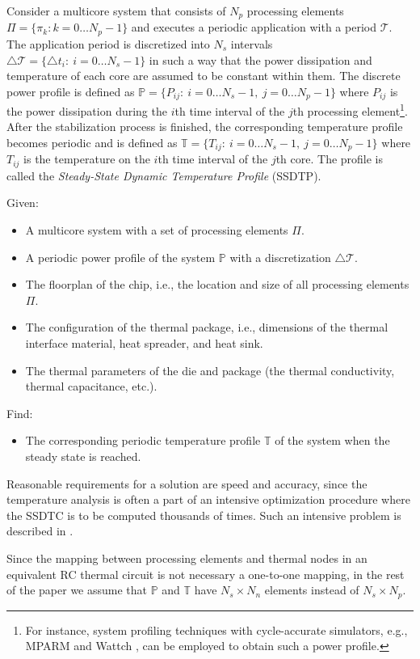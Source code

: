 Consider a multicore system that consists of $N_p$ processing elements $\Pi = \{ \pi_k: k = 0 \dots N_p - 1 \}$ and executes a periodic application with a period $\mathcal{T}$. The application period is discretized into $N_s$ intervals $\triangle \mathcal{T} = \{ \triangle t_i: \: i = 0 \dots N_s - 1 \}$ in such a way that the power dissipation and temperature of each core are assumed to be constant within them. The discrete power profile is defined as $\mathbb{P} = \{ P_{ij}: \: i = 0 \dots N_s - 1, \: j = 0 \dots N_p - 1 \}$ where $P_{ij}$ is the power dissipation during the $i$th time interval of the $j$th processing element\footnote{For instance, system profiling techniques with cycle-accurate simulators, e.g., MPARM \cite{benini2005} and Wattch \cite{brooks2000}, can be employed to obtain such a power profile.}. After the stabilization process is finished, the corresponding temperature profile becomes periodic and is defined as $\mathbb{T} = \{ T_{ij}: \: i = 0 \dots N_s - 1, \: j = 0 \dots N_p - 1 \}$ where $T_{ij}$ is the temperature on the $i$th time interval of the $j$th core. The profile is called the \emph{Steady-State Dynamic Temperature Profile} (SSDTP).

Given:
\begin{itemize}
  \item A multicore system with a set of processing elements $\Pi$.
  \item A periodic power profile of the system $\mathbb{P}$ with a discretization $\triangle \mathcal{T}$.
  \item The floorplan of the chip, i.e., the location and size of all processing elements $\Pi$.
  \item The configuration of the thermal package, i.e., dimensions of the thermal interface material, heat spreader, and heat sink.
  \item The thermal parameters of the die and package (the thermal conductivity, thermal capacitance, etc.).
\end{itemize}

Find:
\begin{itemize}
  \item The corresponding periodic temperature profile $\mathbb{T}$ of the system when the steady state is reached.
\end{itemize}

Reasonable requirements for a solution are speed and accuracy, since the temperature analysis is often a part of an intensive optimization procedure where the SSDTC is to be computed thousands of times. Such an intensive problem is described in .

Since the mapping between processing elements and thermal nodes in an equivalent RC thermal circuit is not necessary a one-to-one mapping, in the rest of the paper we assume that $\mathbb{P}$ and $\mathbb{T}$ have $N_s \times N_n$ elements instead of $N_s \times N_p$.
